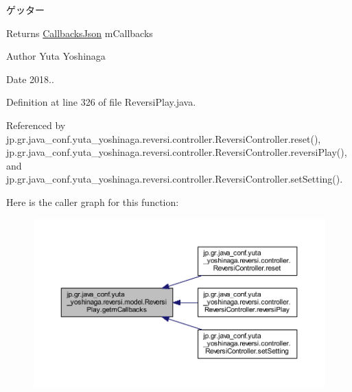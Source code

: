ゲッター 

\begin{DoxyReturn}{Returns}
\hyperlink{classjp_1_1gr_1_1java__conf_1_1yuta__yoshinaga_1_1reversi_1_1model_1_1_callbacks_json}{Callbacks\+Json} m\+Callbacks 
\end{DoxyReturn}
\begin{DoxyAuthor}{Author}
Yuta Yoshinaga 
\end{DoxyAuthor}
\begin{DoxyDate}{Date}
2018.. 
\end{DoxyDate}


Definition at line 326 of file Reversi\+Play.\+java.



Referenced by jp.\+gr.\+java\+\_\+conf.\+yuta\+\_\+yoshinaga.\+reversi.\+controller.\+Reversi\+Controller.\+reset(), jp.\+gr.\+java\+\_\+conf.\+yuta\+\_\+yoshinaga.\+reversi.\+controller.\+Reversi\+Controller.\+reversi\+Play(), and jp.\+gr.\+java\+\_\+conf.\+yuta\+\_\+yoshinaga.\+reversi.\+controller.\+Reversi\+Controller.\+set\+Setting().

Here is the caller graph for this function\+:
\nopagebreak
\begin{figure}[H]
\begin{center}
\leavevmode
\includegraphics[width=350pt]{classjp_1_1gr_1_1java__conf_1_1yuta__yoshinaga_1_1reversi_1_1model_1_1_reversi_play_a0aa576ef708b45c21640e9c562c27ece_icgraph}
\end{center}
\end{figure}
\mbox{\label{classjp_1_1gr_1_1java__conf_1_1yuta__yoshinaga_1_1reversi_1_1model_1_1_reversi_play_a6469b82ef6888bc98e537ce3680f95da}} 

